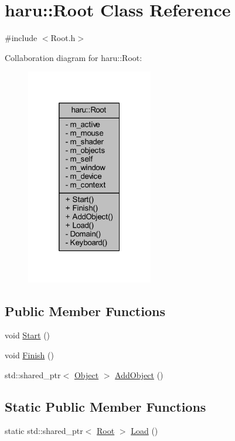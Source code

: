 \hypertarget{classharu_1_1_root}{}\section{haru\+:\+:Root Class Reference}
\label{classharu_1_1_root}


{\ttfamily \#include $<$Root.\+h$>$}



Collaboration diagram for haru\+:\+:Root\+:\nopagebreak
\begin{figure}[H]
\begin{center}
\leavevmode
\includegraphics[width=157pt]{classharu_1_1_root__coll__graph}
\end{center}
\end{figure}
\subsection*{Public Member Functions}
\begin{DoxyCompactItemize}
\item 
void \mbox{\hyperlink{classharu_1_1_root_aedc20d4891295ccb1129a5b386a7906b}{Start}} ()
\item 
void \mbox{\hyperlink{classharu_1_1_root_aa0767148d14c4c9bc06bf41d3a44188f}{Finish}} ()
\item 
std\+::shared\+\_\+ptr$<$ \mbox{\hyperlink{classharu_1_1_object}{Object}} $>$ \mbox{\hyperlink{classharu_1_1_root_a058a9ead82bdc50ef1f8e08413c72131}{Add\+Object}} ()
\end{DoxyCompactItemize}
\subsection*{Static Public Member Functions}
\begin{DoxyCompactItemize}
\item 
static std\+::shared\+\_\+ptr$<$ \mbox{\hyperlink{classharu_1_1_root}{Root}} $>$ \mbox{\hyperlink{classharu_1_1_root_a99a344889111b264e42a1ad724a5ceae}{Load}} ()
\end{DoxyCompactItemize}

